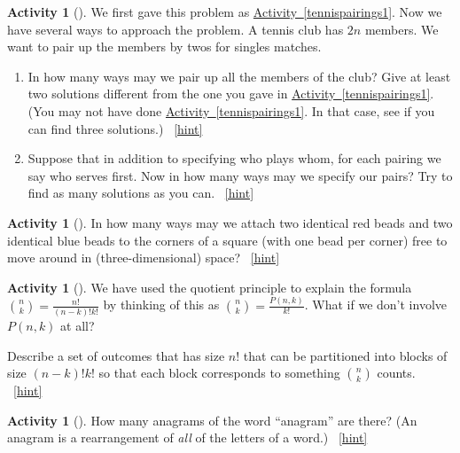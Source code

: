 \documentclass[10pt,]{book}
\theoremstyle{plain}
\theoremstyle{definition}
\theoremstyle{definition}
\theoremstyle{definition}
\newtheorem{activity}[project]{Activity}
\numberwithin{equation}{chapter}
\begin{document}
\begin{activity}[]\label{tennispairings2}
\hypertarget{p-328}{}%
We first gave this problem as \hyperref[tennispairings1]{Activity~\ref{tennispairings1}}. Now we have several ways to approach the problem. A tennis club has \(2n\) members. We want to pair up the members by twos for singles matches.%
\begin{enumerate}[font=\bfseries,label=(\alph*),ref=\alph*]
\item\label{task-76} \hypertarget{p-329}{}%
In how many ways may we pair up all the members of the club? Give at least two solutions different from the one you gave in   \hyperref[tennispairings1]{Activity~\ref{tennispairings1}}. (You may not have done \hyperref[tennispairings1]{Activity~\ref{tennispairings1}}. In that case, see if you can find three solutions.)%
~\hfill{\tiny\hyperlink{a-50.a}{[hint]}\hypertarget{q-50.a}{}}\item\label{task-77} \hypertarget{p-333}{}%
Suppose that in addition to specifying who plays whom, for each pairing we say who serves first.  Now in how many ways may we specify our pairs? Try to find as many solutions as you can.%
~\hfill{\tiny\hyperlink{a-50.b}{[hint]}\hypertarget{q-50.b}{}}\end{enumerate}
\end{activity}
\begin{activity}[]\label{twocolorsofbeads}
\hypertarget{p-337}{}%
In how many ways may we attach two identical red beads and two identical blue beads to the corners of a square (with one bead per corner) free to move around in (three-dimensional) space?%
~\hfill{\tiny\hyperlink{a-51}{[hint]}\hypertarget{q-51}{}}\end{activity}
\begin{activity}[]\label{activity-52}
\hypertarget{p-340}{}%
We have used the quotient principle to explain the formula \(\binom{n}{k} = \frac{n!}{(n-k)!k!}\) by thinking of this as \(\binom{n}{k} = \frac{P(n,k)}{k!}\).  What if we don't involve \(P(n,k)\) at all?%
\par
\hypertarget{p-341}{}%
Describe a set of outcomes that has size \(n!\) that can be partitioned into blocks of size \((n-k)!k!\) so that each block corresponds to something \(\binom{n}{k}\) counts.%
~\hfill{\tiny\hyperlink{a-52}{[hint]}\hypertarget{q-52}{}}\end{activity}
\begin{activity}[]\label{activity-53}
\hypertarget{p-346}{}%
How many anagrams of the word ``anagram'' are there? (An anagram is a rearrangement of \emph{all} of the letters of a word.)%
~\hfill{\tiny\hyperlink{a-53}{[hint]}\hypertarget{q-53}{}}\end{activity}
\typeout{************************************************}
\typeout{************************************************}
\end{document}
